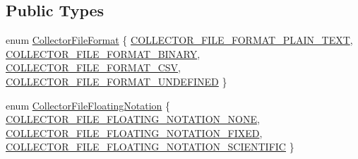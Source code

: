 \subsection*{Public Types}
\begin{DoxyCompactItemize}
\item 
enum \hyperlink{classmts_collector_base_aa228bed8144053d0bfa316f9ac9d0901}{Collector\-File\-Format} \{ \hyperlink{classmts_collector_base_aa228bed8144053d0bfa316f9ac9d0901abbf072308b212f1331b566519d0c178d}{C\-O\-L\-L\-E\-C\-T\-O\-R\-\_\-\-F\-I\-L\-E\-\_\-\-F\-O\-R\-M\-A\-T\-\_\-\-P\-L\-A\-I\-N\-\_\-\-T\-E\-X\-T}, 
\hyperlink{classmts_collector_base_aa228bed8144053d0bfa316f9ac9d0901ab8cbb54e933107857df1a7745a95bf05}{C\-O\-L\-L\-E\-C\-T\-O\-R\-\_\-\-F\-I\-L\-E\-\_\-\-F\-O\-R\-M\-A\-T\-\_\-\-B\-I\-N\-A\-R\-Y}, 
\hyperlink{classmts_collector_base_aa228bed8144053d0bfa316f9ac9d0901a4ee4b02e555603aafc22593f28cc7841}{C\-O\-L\-L\-E\-C\-T\-O\-R\-\_\-\-F\-I\-L\-E\-\_\-\-F\-O\-R\-M\-A\-T\-\_\-\-C\-S\-V}, 
\hyperlink{classmts_collector_base_aa228bed8144053d0bfa316f9ac9d0901ae29b8a9aa7f007f9b5ef48824c0d34c5}{C\-O\-L\-L\-E\-C\-T\-O\-R\-\_\-\-F\-I\-L\-E\-\_\-\-F\-O\-R\-M\-A\-T\-\_\-\-U\-N\-D\-E\-F\-I\-N\-E\-D}
 \}
\item 
enum \hyperlink{classmts_collector_base_ad5d486fde9f8105e4de551d00026ea93}{Collector\-File\-Floating\-Notation} \{ \hyperlink{classmts_collector_base_ad5d486fde9f8105e4de551d00026ea93ad16b37e54a197f2279fa9bbb6671d05a}{C\-O\-L\-L\-E\-C\-T\-O\-R\-\_\-\-F\-I\-L\-E\-\_\-\-F\-L\-O\-A\-T\-I\-N\-G\-\_\-\-N\-O\-T\-A\-T\-I\-O\-N\-\_\-\-N\-O\-N\-E}, 
\hyperlink{classmts_collector_base_ad5d486fde9f8105e4de551d00026ea93a6a7b1140c5dcef2cbd16ba1198df1f6b}{C\-O\-L\-L\-E\-C\-T\-O\-R\-\_\-\-F\-I\-L\-E\-\_\-\-F\-L\-O\-A\-T\-I\-N\-G\-\_\-\-N\-O\-T\-A\-T\-I\-O\-N\-\_\-\-F\-I\-X\-E\-D}, 
\hyperlink{classmts_collector_base_ad5d486fde9f8105e4de551d00026ea93a9aa1dc07dd5f31c35bffc8c03c32e2c8}{C\-O\-L\-L\-E\-C\-T\-O\-R\-\_\-\-F\-I\-L\-E\-\_\-\-F\-L\-O\-A\-T\-I\-N\-G\-\_\-\-N\-O\-T\-A\-T\-I\-O\-N\-\_\-\-S\-C\-I\-E\-N\-T\-I\-F\-I\-C}
 \}
\end{DoxyCompactItemize}
